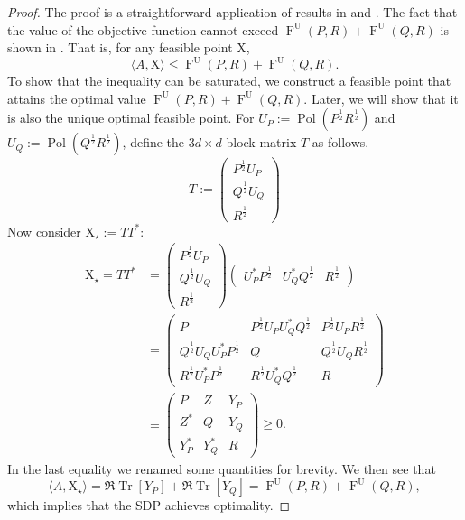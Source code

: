 \documentclass[12pt]{article}
\theoremstyle{definition}
\newcommand{\Fu}[2]{\operatorname{F}^\mathrm{U}\!\left(#1, #2\right)}
\begin{document}
\begin{proof}
    The proof is a straightforward application of results in \cite{watrous2018theory} and \cite{afham2022}. The fact that the value of the objective function cannot exceed $\Fu{P}{R} + \Fu{Q}{R}$ is shown in \cite[Lemma 4 (Equation 37)]{afham2022}. That is, for any feasible point $\mathrm{X}$,
    \begin{equation}
        \langle A,\mathrm{X} \rangle \leq \Fu{P}{R} + \Fu{Q}{R}. 
    \end{equation}
     To show that the inequality can be saturated, we construct a feasible point that attains the optimal value $\Fu{P}{R} + \Fu{Q}{R}$. Later, we will show that it is also the unique optimal feasible point. For $U_P := \operatorname{Pol}\left(P ^{\frac12} R ^{\frac12}  \right)$ and $U_Q := \operatorname{Pol}\left(Q ^{\frac12} R ^{\frac12} \right)$, define the $3d \times d$ block matrix $T$ as follows.
\begin{equation}
        T := 
    \begin{pmatrix}
    P ^{\frac12} U_P \\
    Q ^{\frac12} U_Q \\
    R ^{\frac12} 
    \end{pmatrix}
    \end{equation}
Now consider $\mathrm{X}_\star:= TT^*$:
\begin{equation}
\begin{aligned}
        \mathrm{X}_\star = T T^* &= 
    \begin{pmatrix}
    P ^{\frac12} U_P \\
    Q ^{\frac12} U_Q \\
    R ^{\frac12} 
    \end{pmatrix} 
    \begin{pmatrix}
     U_P^* P ^{\frac12} &
    U_Q^* Q ^{\frac12}  &
    R ^{\frac12} 
    \end{pmatrix} \\ &= 
    \begin{pmatrix}
    P & P^{\frac12} U_P U_Q^* Q^{\frac12} & P^{\frac12} U_P R^{\frac12} \\
    Q^{\frac12} U_Q U_P^* P^{\frac12} & Q & Q^{\frac12} U_Q R^{\frac12} \\
    R^{\frac12} U_P^* P^{\frac12} & R^{\frac12} U_Q^* Q^{\frac12} & R 
    \end{pmatrix} \\ &\equiv    
    \begin{pmatrix}
        P & Z & Y_P \\
        Z^* & Q & Y_Q \\
        Y_P^* & Y_Q^* & R 
    \end{pmatrix} \geq 0.
\end{aligned}      
\end{equation}
In the last equality we renamed some quantities for brevity. We then see that
\begin{equation}
    \langle A, \mathrm{X}_\star \rangle = \Re\operatorname{Tr}[Y_P] + \Re \operatorname{Tr}[Y_Q] = \Fu{P}{R} + \Fu{Q}{R}, 
\end{equation}
which implies that the SDP achieves optimality.  


\end{proof}
\end{document}
